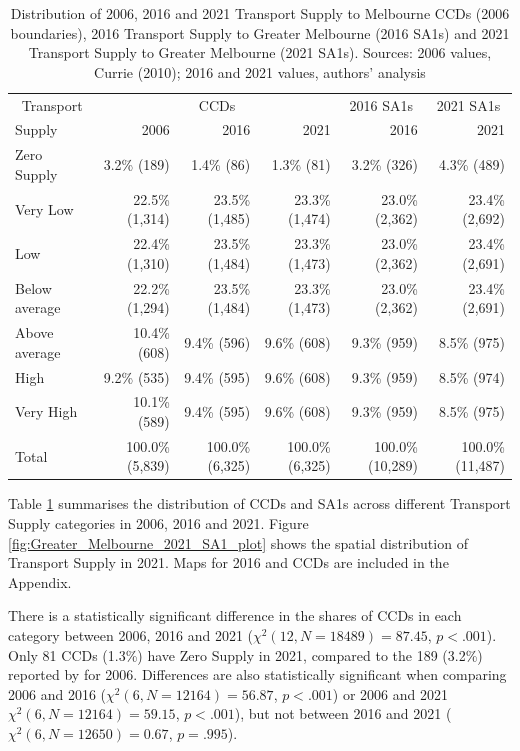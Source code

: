 \documentclass[preprint, 3p,
authoryear]{elsarticle} %
\begin{document}
\begin{table}

\caption{\label{tab:Greater_Melbourne_CCDs_SA1_table}Distribution of 2006, 2016 and 2021 Transport Supply to Melbourne CCDs (2006 boundaries), 2016 Transport Supply to Greater Melbourne (2016 SA1s) and 2021 Transport Supply to Greater Melbourne (2021 SA1s). Sources: 2006 values, Currie (2010); 2016 and 2021 values, authors' analysis}
\centering
\begin{tabular}[t]{l|r|r|r|r|r}
\hline
\multicolumn{1}{c|}{Transport} & \multicolumn{3}{c|}{CCDs} & \multicolumn{1}{c|}{2016 SA1s} & \multicolumn{1}{c}{2021 SA1s} \\
\cline{1-1} \cline{2-4} \cline{5-5} \cline{6-6}
Supply & 2006 & 2016 & 2021 & 2016 & 2021\\
\hline
Zero Supply & 3.2\%   (189) & 1.4\%    (86) & 1.3\%    (81) & 3.2\%    (326) & 4.3\%    (489)\\
\hline
Very Low & 22.5\% (1,314) & 23.5\% (1,485) & 23.3\% (1,474) & 23.0\%  (2,362) & 23.4\%  (2,692)\\
\hline
Low & 22.4\% (1,310) & 23.5\% (1,484) & 23.3\% (1,473) & 23.0\%  (2,362) & 23.4\%  (2,691)\\
\hline
Below average & 22.2\% (1,294) & 23.5\% (1,484) & 23.3\% (1,473) & 23.0\%  (2,362) & 23.4\%  (2,691)\\
\hline
Above average & 10.4\%   (608) & 9.4\%   (596) & 9.6\%   (608) & 9.3\%    (959) & 8.5\%    (975)\\
\hline
High & 9.2\%   (535) & 9.4\%   (595) & 9.6\%   (608) & 9.3\%    (959) & 8.5\%    (974)\\
\hline
Very High & 10.1\%   (589) & 9.4\%   (595) & 9.6\%   (608) & 9.3\%    (959) & 8.5\%    (975)\\
\hline
Total & 100.0\% (5,839) & 100.0\% (6,325) & 100.0\% (6,325) & 100.0\% (10,289) & 100.0\% (11,487)\\
\hline
\end{tabular}
\end{table}

Table \ref{tab:Greater_Melbourne_CCDs_SA1_table} summarises the
distribution of CCDs and SA1s across different Transport Supply
categories in 2006, 2016 and 2021. Figure
\ref{fig:Greater_Melbourne_2021_SA1_plot} shows the spatial distribution
of Transport Supply in 2021. Maps for 2016 and CCDs are included in the
Appendix.

There is a statistically significant difference in the shares of CCDs in
each category between 2006, 2016 and 2021
(\(\chi^2(12, N = 18489) = 87.45\), \(p < .001\)). Only 81 CCDs (1.3\%)
have Zero Supply in 2021, compared to the 189 (3.2\%) reported by
\citet{currie2010identifying} for 2006. Differences are also
statistically significant when comparing 2006 and 2016
(\(\chi^2(6, N = 12164) = 56.87\), \(p < .001\)) or 2006 and 2021
\(\chi^2(6, N = 12164) = 59.15\), \(p < .001\)), but not between 2016
and 2021 (\(\chi^2(6, N = 12650) = 0.67\), \(p = .995\)).
\end{document}

